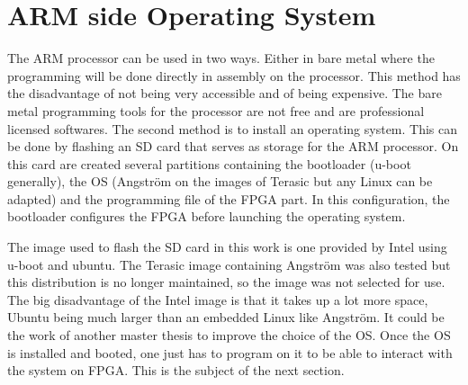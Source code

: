 \section{ARM side Operating System}

The ARM processor can be used in two ways. Either in bare metal where the programming will be done 
directly in assembly on the processor. This method has the disadvantage of not being very 
accessible and of being expensive. The bare metal programming tools for the processor are not 
free and are professional licensed softwares. The second method is to install an operating system. 
This can be done by flashing an SD card that serves as storage for the ARM processor. On this card 
are created several partitions containing the bootloader (u-boot generally), the OS (Angström on 
the images of Terasic but any Linux can be adapted) and the programming file of the FPGA part. In 
this configuration, the bootloader configures the FPGA before launching the operating system. 

The image used to flash the SD card in this work is one provided by Intel using u-boot and ubuntu. The 
Terasic image containing Angström was also tested but this distribution is no longer maintained, so 
the image was not selected for use. The big disadvantage of the Intel image is that it takes up a 
lot more space, Ubuntu being much larger than an embedded Linux like Angström. It could be the work of 
another master thesis to improve the choice of the OS. Once the OS is installed and booted, one just 
has to program on it to be able to interact with the system on FPGA. This is the subject of the next 
section.
